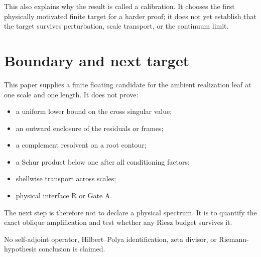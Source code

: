 \documentclass[12pt]{article}
\theoremstyle{remark}
\begin{document}
This also explains why the result is called a calibration.  It chooses the
first physically motivated finite target for a harder proof; it does not yet
establish that the target survives perturbation, scale transport, or the
continuum limit.

\section{Boundary and next target}

This paper supplies a finite floating candidate for the ambient realization
leaf at one scale and one length.  It does not prove:
\begin{itemize}[leftmargin=2em]
\item a uniform lower bound on the cross singular value;
\item an outward enclosure of the residuals or frames;
\item a complement resolvent on a root contour;
\item a Schur product below one after all conditioning factors;
\item shellwise transport across scales;
\item physical interface R or Gate A.
\end{itemize}
The next step is therefore not to declare a physical spectrum.  It is to
quantify the exact oblique amplification and test whether any Riesz budget
survives it.

No self-adjoint operator, Hilbert--Polya identification, zeta divisor, or
Riemann-hypothesis conclusion is claimed.



\end{document}
